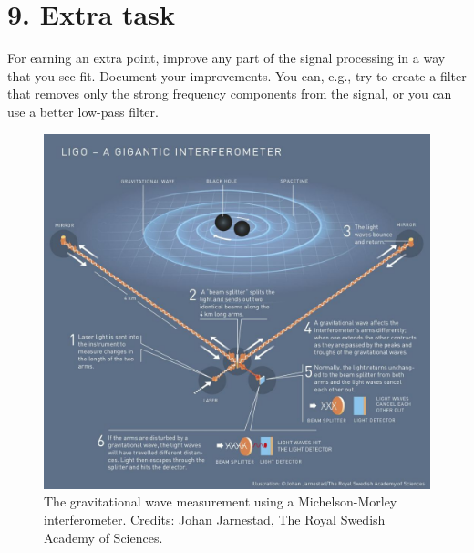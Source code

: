 \section{9. Extra task}
For earning an extra point, improve any part of the signal processing
in a way that you see fit. Document your improvements. You can, e.g.,
try to create a filter that removes only the strong frequency
components from the signal, or you can use a better low-pass filter.

\begin{figure}
  \begin{center}
    \includegraphics[width=\textwidth]{Assignments/figures/ligo_nobel.jpg}
  \end{center}
  \caption{The gravitational wave measurement using a Michelson-Morley interferometer. Credits: Johan Jarnestad, The Royal Swedish Academy of Sciences.}
  \label{fig:ligo_nobel_diag}
\end{figure}

